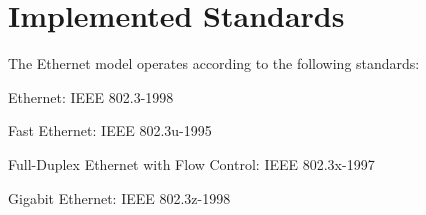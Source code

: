 \section{Implemented Standards}
\label{sec:ethernet:implemented-standards}

The Ethernet model operates according to the following standards:

\begin{compactitem}
  \item Ethernet: IEEE 802.3-1998
  \item Fast Ethernet: IEEE 802.3u-1995
  \item Full-Duplex Ethernet with Flow Control: IEEE 802.3x-1997
  \item Gigabit Ethernet: IEEE 802.3z-1998
\end{compactitem}


